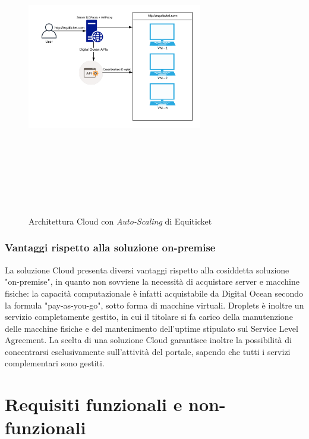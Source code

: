 \begin{figure}[htbp]
	\centering
	\includegraphics[width=0.68\textwidth, height=13cm, keepaspectratio]{chapter4/immagini/droplet}
	\caption{Architettura Cloud con \emph{Auto-Scaling} di Equiticket}
	\label{arcloud}
\end{figure}
\subsubsection{Vantaggi rispetto alla soluzione on-premise}
La soluzione Cloud presenta diversi vantaggi rispetto alla cosiddetta soluzione "on-premise", in quanto non sovviene la necessità di acquistare server e macchine fisiche: la capacità computazionale è infatti acquistabile da Digital Ocean secondo la formula "pay-as-you-go", sotto forma di macchine virtuali. Droplets è inoltre un servizio completamente gestito, in cui il titolare si fa carico della manutenzione delle macchine fisiche e del mantenimento dell'uptime stipulato sul Service Level Agreement. La scelta di una soluzione Cloud garantisce inoltre la possibilità di concentrarsi esclusivamente sull'attività del portale, sapendo che tutti i servizi complementari sono gestiti. 
\section{Requisiti funzionali e non-funzionali} \label{sec:requisiti}
